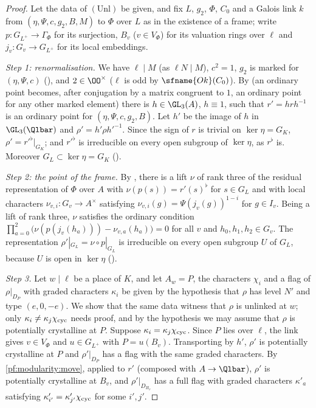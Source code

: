 \begin{proof}
Let the data of $(\mathrm{Unl})$ be given, and fix $L$, $g_2$, $\Phi$, $C_0$ and a Galois link $k$ from
$(\eta,\Psi,c,g_2,B,M)$ to $\Phi$ over $L$ as in the existence of a frame; write $p:G_{L^+}\to\Gamma_\Phi$ for its
surjection, $B_v$ ($v\in V_\Phi$) for its valuation rings over $\ell$ and $j_v:G_v\to G_{L^+}$ for its local embeddings.

\emph{Step 1: renormalisation.} We have $\ell\mid M$ (as $\ell N\mid M$), $c^2=1$, $g_2$ is marked for $(\eta,\Psi,c)$
(), and $2\in\OO^\times$ ($\ell$ is odd by $\sfname{Ok}(C_0)$). By
 (an ordinary point becomes, after conjugation by a matrix congruent to $1$,
an ordinary point for any other marked element) there is $h\in\GL_3(A)$, $h\equiv1$, such that $r'=hrh^{-1}$ is an
ordinary point for $(\eta,\Psi,c,g_2,B)$. Let $h'$ be the image of $h$ in $\GL_3(\Qlbar)$ and $\rho'=h'\rho h'^{-1}$.
Since the sign of $r$ is trivial on $\ker\eta=G_K$, $\rho'=r'^\flat|_{G_K}$; and $r'^\flat$ is irreducible on every open
subgroup of $\ker\eta$, as $r^\flat$ is. Moreover $G_L\subset\ker\eta=G_K$ ().

\emph{Step 2: the point of the frame.} By , there is a lift $\nu$ of rank three of
the residual representation of $\Phi$ over $A$ with $\nu(p(s))=r'(s)^\flat$ for $s\in G_L$ and with local characters
$\nu_{v,i}:G_v\to A^\times$ satisfying $\nu_{v,i}(g)=\Psi(j_v(g))^{1-i}$ for $g\in I_v$. Being a lift of rank three, $\nu$
satisfies the ordinary condition
$\prod_{a=0}^2\bigl(\nu(p(j_v(h_a)))-\nu_{v,a}(h_a)\bigr)=0$ for all $v$ and $h_0,h_1,h_2\in G_v$. The representation
$\rho'|_{G_L}=\nu\circ p|_{G_L}$ is irreducible on every open subgroup $U$ of $G_L$, because $U$ is open in $\ker\eta$
().

\emph{Step 3.} Let $w\mid\ell$ be a place of $K$, and let $A_w=P$, the characters $\chi_i$ and a flag of $\rho|_{D_P}$
with graded characters $\kappa_i$ be given by the hypothesis that $\rho$ has level $N'$ and type $(e,0,-e)$. We show that
the same data witness that $\rho$ is unlinked at $w$; only $\kappa_i\ne\kappa_j\chi_{\mathrm{cyc}}$ needs proof, and by the
hypothesis we may assume that $\rho$ is potentially crystalline at $P$. Suppose $\kappa_i=\kappa_j\chi_{\mathrm{cyc}}$. Since
$P$ lies over $\ell$, the link gives $v\in V_\Phi$ and $u\in G_{L^+}$ with $P=u(B_v)$. Transporting by $h'$, $\rho'$ is
potentially crystalline at $P$ and $\rho'|_{D_P}$ has a flag with the same graded characters. By
\cref{pf:modularity:move}, applied to $r'$ (composed with $A\to\Qlbar$), $\rho'$ is potentially crystalline at $B_v$, and
$\rho'|_{D_{B_v}}$ has a full flag with graded characters $\kappa'_a$ satisfying $\kappa'_{i'}=\kappa'_{j'}\chi_{\mathrm{cyc}}$
for some $i',j'$.


\end{proof}

